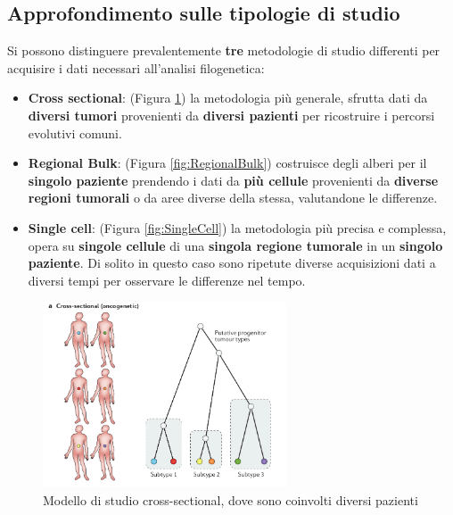 \documentclass[a4paper]{article}
\begin{document}
	\subsection{\large Approfondimento sulle tipologie di studio}

	Si possono distinguere prevalentemente \textbf{tre} metodologie di studio differenti per acquisire i dati necessari all'analisi filogenetica: 

	\begin{itemize}
	\item \textbf{Cross sectional}: (Figura \ref{fig:CrossSectional}) la metodologia più generale, sfrutta dati da \textbf{diversi tumori} provenienti da \textbf{diversi pazienti} per ricostruire i percorsi evolutivi comuni.
	\item \textbf{Regional Bulk}: (Figura \ref{fig:RegionalBulk}) costruisce degli alberi per il \textbf{singolo paziente} prendendo i dati da \textbf{più cellule} provenienti da \textbf{diverse regioni tumorali} o da aree diverse
			              della stessa, valutandone le differenze.
	\item \textbf{Single cell}: (Figura \ref{fig:SingleCell}) la metodologia più precisa e complessa, opera su \textbf{singole cellule} di una \textbf{singola regione tumorale} in un \textbf{singolo paziente}. Di solito in questo caso 
				    sono ripetute diverse acquisizioni dati a diversi tempi per osservare le differenze nel tempo.
	\end{itemize}

	\begin{figure}[H]
	  \centering
	  \includegraphics[height=5.5cm, keepaspectratio]{CrossSectional.png}%
	  \captionsetup{justification=centering,margin=0.5cm}
	  \caption{Modello di studio cross-sectional, dove sono coinvolti diversi pazienti} \label{fig:CrossSectional}
	\end{figure}
\end{document}
